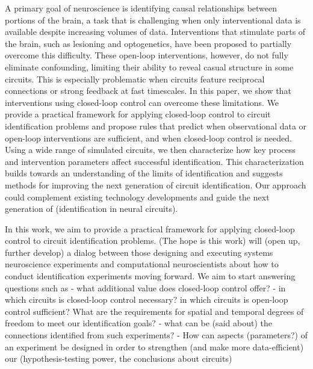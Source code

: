 A primary goal of neuroscience is identifying causal relationships between portions of the brain,
a task that is challenging when only interventional data is available despite increasing volumes of data.
Interventions that stimulate parts of the brain, such as lesioning and optogenetics, have been proposed to partially overcome this difficulty.
These open-loop interventions, however, do not fully eliminate confounding, limiting their ability to reveal casual structure in some circuits. This is especially problematic when circuits feature reciprocal connections or strong feedback at fast timescales.
In this paper, we show that interventions using closed-loop control can overcome these limitations.
We provide a practical framework for applying closed-loop control to circuit identification problems and propose rules that predict when observational data or open-loop interventions are sufficient, and when closed-loop control is needed. Using a wide range of simulated circuits, we then characterize how key process and intervention parameters affect successful identification. This characterization builds towards an understanding of the limits of identification  and suggests methods for improving the next generation of circuit identification.
Our approach could complement existing technology developments and guide the next generation of (identification in neural circuits).


In this work, we aim to provide a practical framework for applying closed-loop control to circuit identification problems. (The hope is this work) will (open up, further develop) a dialog between those designing and executing systems neuroscience experiments and computational neuroscientists about how to conduct identification experiments moving forward. We aim to start answering questions such as
- what additional value does closed-loop control offer?
- in which circuits is closed-loop control necessary? in which circuits is open-loop control sufficient? What are the requirements for spatial and temporal degrees of freedom to meet our identification goals?
- what can be (said about) the connections identified from such experiments?
- How can aspects (parameters?) of an experiment be designed in order to strengthen (and make more data-efficient) our (hypothesis-testing power, the conclusions about circuits)

